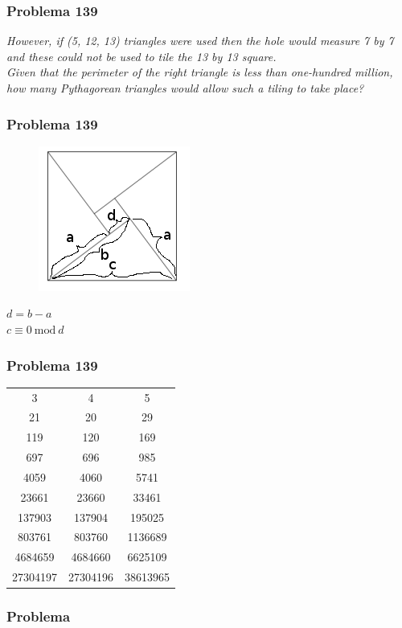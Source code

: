 \documentclass{beamer}
\begin{document}
\begin{frame}
    \frametitle{Problema 139}

    \begin{center}
        \textit{
            However, if (5, 12, 13) triangles were used then the hole would measure 7 by 7 and these could not be used to tile the 13 by 13 square.\\
            Given that the perimeter of the right triangle is less than one-hundred million, how many Pythagorean triangles would allow such a tiling to take place?
        }
    \end{center}
\end{frame}

\begin{frame}
    \frametitle{Problema 139}

    \begin{figure}[htpb]
        \centering
        \includegraphics[width=0.4\linewidth]{images/p139_2.png}
    \end{figure}

    \begin{center}
        $d=b-a$ \\
        $c \equiv 0 \: \text{mod}\: d$
    \end{center}

\end{frame}

\begin{frame}
    \frametitle{Problema 139}

    \begin{table}[htpb]
        \centering
        \begin{tabular}{c c c}
            3        & 4        & 5 \\
            21       & 20       & 29 \\
            119      & 120      & 169 \\
            697      & 696      & 985  \\
            4059     & 4060     & 5741  \\
            23661    & 23660    & 33461  \\
            137903   & 137904   & 195025  \\
            803761   & 803760   & 1136689  \\
            4684659  & 4684660  & 6625109   \\
            27304197 & 27304196 & 38613965
        \end{tabular}
    \end{table}
\end{frame}


\begin{frame}
    \frametitle{Problema }

    \begin{center}
        \textit{
        }
    \end{center}
\end{frame}
\end{document}
